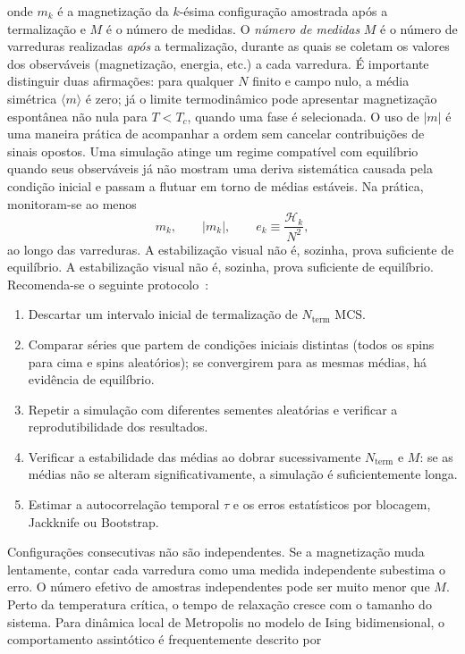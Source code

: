 \documentclass[12pt,a4paper]{article}
\begin{document}
%
onde $m_k$ é a magnetização da $k$-ésima configuração amostrada após a termalização e $M$ é o número de medidas. O \emph{número de medidas} $M$ é o número de varreduras realizadas \emph{após} a termalização, durante as quais se coletam os valores dos observáveis
(magnetização, energia, etc.) a cada varredura. É importante distinguir duas afirmações: para qualquer $N$ finito e campo nulo, a média simétrica $\langle m\rangle$ é zero; já o limite termodinâmico pode apresentar magnetização espontânea não nula para $T<T_c$, quando uma fase é selecionada. O uso de $|m|$ é uma maneira prática de acompanhar a ordem sem cancelar contribuições de sinais opostos. Uma simulação atinge um regime compatível com equilíbrio quando seus observáveis já não mostram uma deriva sistemática causada pela condição inicial e passam a flutuar em torno de médias estáveis. Na prática, monitoram-se ao menos
%
\[
    m_k,\qquad |m_k|,\qquad e_k\equiv\frac{\mathcal H_k}{N^2},
\]
%
ao longo das varreduras.
%
A estabilização visual não é, sozinha, prova suficiente de equilíbrio. A estabilização visual não é, sozinha, prova suficiente de equilíbrio. Recomenda-se o
seguinte protocolo~\cite{NewmanBarkema1999,LandauBinder2005}:
%
\begin{enumerate}
    \item Descartar um intervalo inicial de termalização de $N_{\mathrm{term}}$ MCS.
    \item Comparar séries que partem de condições iniciais distintas (todos os spins para
          cima e spins aleatórios); se convergirem para as mesmas médias, há evidência de
          equilíbrio.
    \item Repetir a simulação com diferentes sementes aleatórias e verificar a
          reprodutibilidade dos resultados.
    \item Verificar a estabilidade das médias ao dobrar sucessivamente $N_{\mathrm{term}}$
          e $M$: se as médias não se alteram significativamente, a simulação é
          suficientemente longa.
    \item Estimar a autocorrelação temporal $\tau$ e os erros estatísticos por blocagem,
          Jackknife ou Bootstrap.
\end{enumerate}
%
Configurações consecutivas não são independentes. Se a magnetização muda lentamente, contar cada varredura como uma medida independente subestima o erro. O número efetivo de amostras independentes pode ser muito menor que $M$. Perto da temperatura crítica, o tempo de relaxação cresce com o tamanho do sistema. Para dinâmica local de Metropolis no modelo de Ising bidimensional, o comportamento assintótico é frequentemente descrito por
\end{document}
